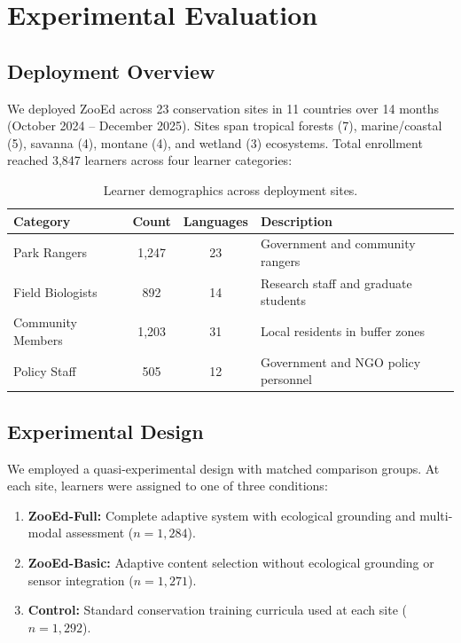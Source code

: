 \section{Experimental Evaluation}

\label{sec:evaluation}

\subsection{Deployment Overview}

We deployed ZooEd across 23 conservation sites in 11 countries over 14 months (October 2024 -- December 2025).
Sites span tropical forests (7), marine/coastal (5), savanna (4), montane (4), and wetland (3) ecosystems.
Total enrollment reached 3,847 learners across four learner categories:

\begin{table}[H]
\centering
\caption{Learner demographics across deployment sites.}
\label{tab:demographics}
\begin{tabularx}{\textwidth}{@{}lccX@{}}
\toprule
\textbf{Category} & \textbf{Count} & \textbf{Languages} & \textbf{Description} \\
\midrule
Park Rangers & 1,247 & 23 & Government and community rangers \\
Field Biologists & 892 & 14 & Research staff and graduate students \\
Community Members & 1,203 & 31 & Local residents in buffer zones \\
Policy Staff & 505 & 12 & Government and NGO policy personnel \\
\bottomrule
\end{tabularx}
\end{table}

\subsection{Experimental Design}

We employed a quasi-experimental design with matched comparison groups.
At each site, learners were assigned to one of three conditions:

\begin{enumerate}[leftmargin=*]
    \item \textbf{ZooEd-Full:} Complete adaptive system with ecological grounding and multi-modal assessment ($n = 1,284$).
    \item \textbf{ZooEd-Basic:} Adaptive content selection without ecological grounding or sensor integration ($n = 1,271$).
    \item \textbf{Control:} Standard conservation training curricula used at each site ($n = 1,292$).
\end{enumerate}

